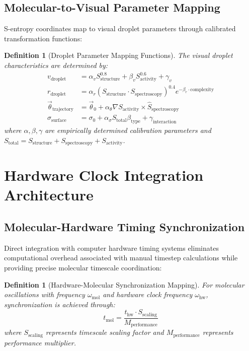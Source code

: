 \documentclass[12pt,a4paper]{article}
\newtheorem{definition}[theorem]{Definition}
\begin{document}
\subsection{Molecular-to-Visual Parameter Mapping}

S-entropy coordinates map to visual droplet parameters through calibrated transformation functions:

\begin{definition}[Droplet Parameter Mapping Functions]
The visual droplet characteristics are determined by:
\begin{align}
v_{\text{droplet}} &= \alpha_v S_{\text{structure}}^{0.8} + \beta_v S_{\text{activity}}^{0.6} + \gamma_v \\
r_{\text{droplet}} &= \alpha_r (S_{\text{structure}} \cdot S_{\text{spectroscopy}})^{0.4} e^{-\beta_r \cdot \text{complexity}} \\
\vec{\theta}_{\text{trajectory}} &= \vec{\theta}_0 + \alpha_\theta \nabla S_{\text{activity}} \times \hat{S}_{\text{spectroscopy}} \\
\sigma_{\text{surface}} &= \sigma_0 + \alpha_\sigma S_{\text{total}} \beta_{\text{type}} + \gamma_{\text{interaction}}
\end{align}
where $\alpha, \beta, \gamma$ are empirically determined calibration parameters and $S_{\text{total}} = S_{\text{structure}} + S_{\text{spectroscopy}} + S_{\text{activity}}$.
\end{definition}

\section{Hardware Clock Integration Architecture}

\subsection{Molecular-Hardware Timing Synchronization}

Direct integration with computer hardware timing systems eliminates computational overhead associated with manual timestep calculations while providing precise molecular timescale coordination:

\begin{definition}[Hardware-Molecular Synchronization Mapping]
For molecular oscillations with frequency $\omega_{\text{mol}}$ and hardware clock frequency $\omega_{\text{hw}}$, synchronization is achieved through:
\begin{equation}
t_{\text{mol}} = \frac{t_{\text{hw}} \cdot S_{\text{scaling}}}{M_{\text{performance}}}
\end{equation}
where $S_{\text{scaling}}$ represents timescale scaling factor and $M_{\text{performance}}$ represents performance multiplier.
\end{definition}
\end{document}
